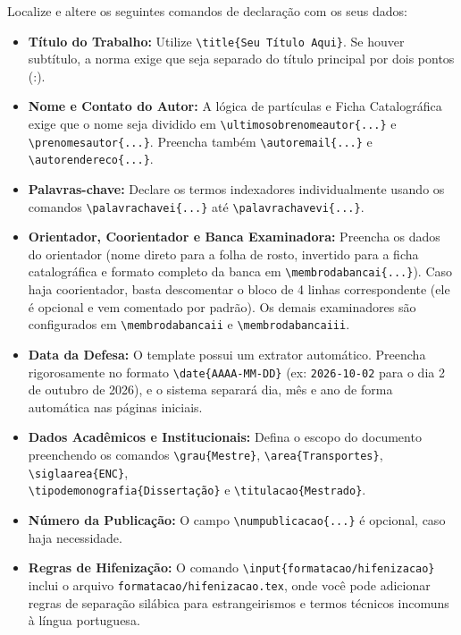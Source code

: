 \documentclass[a4paper,12pt]{article}
\begin{document}
Localize e altere os seguintes comandos de declaração com os seus dados:

\begin{itemize}
    \item \textbf{Título do Trabalho:} Utilize \texttt{\textbackslash title\{Seu Título Aqui\}}. Se houver subtítulo, a norma exige que seja separado do título principal por dois pontos (:).
    \item \textbf{Nome e Contato do Autor:} A lógica de partículas e Ficha Catalográfica exige que o nome seja dividido em \texttt{\textbackslash ultimosobrenomeautor\{...\}} e \texttt{\textbackslash prenomesautor\{...\}}. Preencha também \texttt{\textbackslash autoremail\{...\}} e \texttt{\textbackslash autorendereco\{...\}}.
    \item \textbf{Palavras-chave:} Declare os termos indexadores individualmente usando os comandos \texttt{\textbackslash palavrachavei\{...\}} até \texttt{\textbackslash palavrachavevi\{...\}}.
    \item \textbf{Orientador, Coorientador e Banca Examinadora:} Preencha os dados do orientador (nome direto para a folha de rosto, invertido para a ficha catalográfica e formato completo da banca em \texttt{\textbackslash membrodabancai\{...\}}). Caso haja coorientador, basta descomentar o bloco de 4 linhas correspondente (ele é opcional e vem comentado por padrão). Os demais examinadores são configurados em \texttt{\textbackslash membrodabancaii} e \texttt{\textbackslash membrodabancaiii}.
    \item \textbf{Data da Defesa:} O template possui um extrator automático. Preencha rigorosamente no formato \texttt{\textbackslash date\{AAAA-MM-DD\}} (ex: \texttt{2026-10-02} para o dia 2 de outubro de 2026), e o sistema separará dia, mês e ano de forma automática nas páginas iniciais.
    \item \textbf{Dados Acadêmicos e Institucionais:} Defina o escopo do documento preenchendo os comandos \texttt{\textbackslash grau\{Mestre\}}, \texttt{\textbackslash area\{Transportes\}}, \texttt{\textbackslash siglaarea\{ENC\}}, \\ \texttt{\textbackslash tipodemonografia\{Dissertação\}} e \texttt{\textbackslash titulacao\{Mestrado\}}.
    \item \textbf{Número da Publicação:} O campo \texttt{\textbackslash numpublicacao\{...\}} é opcional, caso haja necessidade.
    \item \textbf{Regras de Hifenização:} O comando \texttt{\textbackslash input\{formatacao/hifenizacao\}} inclui o arquivo \texttt{formatacao/hifenizacao.tex}, onde você pode adicionar regras de separação silábica para estrangeirismos e termos técnicos incomuns à língua portuguesa.
\end{itemize}
\end{document}
